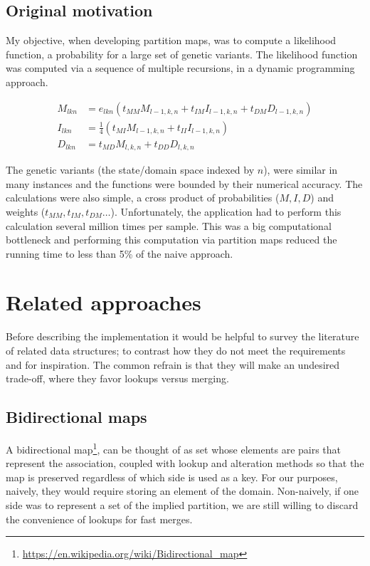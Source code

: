 \documentclass{article}
\begin{document}
\subsection{Original motivation}

My objective,
when developing partition maps,
was to compute a likelihood function,
a probability for a large set of genetic variants.
The likelihood function was computed via a sequence of multiple recursions,
in a dynamic programming approach.

\begin{align}
  M_{lkn} &= e_{lkn}(t_{MM}M_{l-1,k,n} + t_{IM}I_{l-1,k,n} + t_{DM}D_{l-1,k,n})
  \nonumber \\
  I_{lkn} &= \frac{1}{4}(t_{MI}M_{l-1,k,n} + t_{II}I_{l-1,k,n}) \nonumber \\
  D_{lkn} &= t_{MD}M_{l,k,n} + t_{DD}D_{l,k,n} \nonumber
\end{align}

The genetic variants (the state/domain space indexed by $n$),
were similar in many instances and the functions were
bounded by their numerical accuracy.
The calculations were also simple,
a cross product of probabilities ($M, I, D$) and weights ($t_{MM}, t_{IM}, t_{DM} \ldots$).
Unfortunately,
the application had to perform this calculation several million times
per sample.
This was a big computational bottleneck
and performing this computation via partition maps
reduced the running time to less than 5\% of the naive approach.


\section{Related approaches}

Before describing the implementation it would be helpful to survey the
literature of related data structures;
to contrast how they do not meet the requirements and
for inspiration.
The common refrain is that they will make an undesired trade-off,
where they favor lookups versus merging.

\subsection{Bidirectional maps}

A bidirectional map\footnote{\url{https://en.wikipedia.org/wiki/Bidirectional_map}},
can be thought of as set whose elements are pairs that represent the association,
coupled with lookup and alteration methods so that the map is preserved regardless
of which side is used as a key.
For our purposes, naively, they would require storing an element of the domain.
Non-naively, if one side was to represent a set of the implied partition,
we are still willing to discard the convenience of lookups for fast merges.
\end{document}
